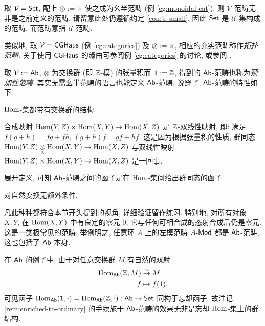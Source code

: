 \begin{example}
	取 $\mathcal{V} = \mathsf{Set}$, 配上 $\otimes := \times$ 使之成为幺半范畴 (例 \ref{eg:monoidal-cat}), 则 $\mathcal{V}$-范畴无非是之前定义的范畴. 请留意此处仍遵循约定 \ref{con:U-small}, 因此 $\mathsf{Set}$ 是 $\mathcal{U}$-集构成的范畴, 而范畴意指 $\mathcal{U}$-范畴.
\end{example}

\begin{example}
	类似地, 取 $\mathcal{V} = \mathsf{CGHaus}$ (例 \ref{eg:categories}) 及 $\otimes := \times$, 相应的充实范畴称作\emph{拓扑范畴}. 关于使用 $\mathsf{CGHaus}$ 的缘由可参阅例 \ref{eg:categories} 的讨论, 或参阅 \cite[Chapter 5]{May99}. 
\end{example}

\begin{example}\label{eg:Ab-cat}
	取 $\mathcal{V} := \mathsf{Ab}$, $\otimes$ 为交换群 (即 $\mathbb{Z}$-模) 的张量积而 $\mathbf{1} := \mathbb{Z}$, 得到的 $\mathsf{Ab}$-范畴也称为\emph{预加性范畴}. 其实无需幺半范畴的语言也能定义 $\mathsf{Ab}$-范畴. 说穿了, $\mathsf{Ab}$-范畴的特性如下.
	\begin{compactitem}
		\item $\operatorname{Hom}$-集都带有交换群的结构.
		\item 合成映射 $\operatorname{Hom}(Y, Z) \times \operatorname{Hom}(X, Y) \to \operatorname{Hom}(X, Z)$ 是 $\mathbb{Z}$-双线性映射, 即: 满足 $f(g+h) = fg+ fh$, $(g+h)f = gf + hf$. 这是因为根据张量积的性质, 群同态 $\operatorname{Hom}(Y,Z) \underset{\mathbb{Z}}{\otimes} \operatorname{Hom}(X, Y) \to \operatorname{Hom}(X, Z)$ 与双线性映射 $\operatorname{Hom}(Y, Z) \times \operatorname{Hom}(X, Y) \to \operatorname{Hom}(X, Z)$ 是一回事.
		\item 展开定义, 可知 $\mathsf{Ab}$-范畴之间的函子是在 $\operatorname{Hom}$-集间给出群同态的函子.
		\item 对自然变换无额外条件.
	\end{compactitem}
	 凡此种种都符合本节开头提到的视角, 详细验证留作练习. 特别地, 对所有对象 $X, Y$, 在 $\operatorname{Hom}(X, Y)$ 中有良定的零元 $0$, 它与任何可相合成的态射合成后仍是零元. 这是一类极常见的范畴: 举例明之, 任意环 $A$ 上的左模范畴 $A\text{-}\mathsf{Mod}$ 都是 $\mathsf{Ab}$-范畴, 这也包括了 $\mathsf{Ab}$ 本身.

	在 $\mathsf{Ab}$ 的例子中, 由于对任意交换群 $M$ 有自然的双射
	\begin{align*}
		\operatorname{Hom}_{\mathsf{Ab}}(\mathbb{Z}, M) & \stackrel{\sim}{\rightarrow} M \\
		f & \mapsto f(1),
	\end{align*}
	可见函子 $\operatorname{Hom}_{\mathsf{Ab}}(\mathbf{1}, \cdot) = \operatorname{Hom}_{\mathsf{Ab}}(\mathbb{Z}, \cdot): \mathsf{Ab} \to \mathsf{Set}$ 同构于忘却函子.  故注记 \ref{rem:enriched-to-ordinary} 的手续施于 $\mathsf{Ab}$-范畴的效果无非是忘却 $\operatorname{Hom}$-集上的群结构.
\end{example}

